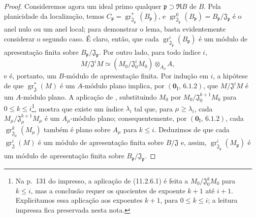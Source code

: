 \begin{proof}
Consideremos agora um ideal primo qualquer $\mathfrak p\supset\mathfrak RB$ de $B$. Pela planicidade da localização, temos $C_{\mathfrak p}=\operatorname{gr}_{\mathfrak J_{\mathfrak p}}^*(B_{\mathfrak p})$, e $\operatorname{gr}_{\mathfrak J_{\mathfrak p}}^0(B_{\mathfrak p})=B_{\mathfrak p}/\mathfrak J_{\mathfrak p}$ é o anel nulo ou um anel local; para demonstrar o lema, basta evidentemente considerar o segundo caso. É claro, então, que cada $\operatorname{gr}_{\mathfrak J_{\mathfrak p}}^i(B_{\mathfrak p})$ é um módulo de apresentação finita sobre $B_{\mathfrak p}/\mathfrak J_{\mathfrak p}$. Por outro lado, para todo índice $i$,
\[
M/\mathfrak J^iM
\simeq(M_0/\mathfrak J_0^iM_0)\otimes_{A_0}A,
\]
e é, portanto, um $B$-módulo de apresentação finita. Por indução em $i$, a hipótese de que $\operatorname{gr}_{\mathfrak J}^*(M)$ é um $A$-módulo plano implica, por $(\mathbf 0_{\mathrm I},\,6.1.2)$, que $M/\mathfrak J^iM$ é um $A$-módulo plano. A aplicação de , substituindo $M_0$ por $M_0/\mathfrak J_0^{k+1}M_0$ para $0\leq k\leq i$\footnote{Na p.~131 do impresso, a aplicação de (11.2.6.1) é feita a $M_0/\mathfrak J_0^kM_0$ para $k\leq i$, mas a conclusão requer os quocientes de expoente $k+1$ até $i+1$. Explicitamos essa aplicação aos expoentes $k+1$, para $0\leq k\leq i$; a leitura impressa fica preservada nesta nota.}, mostra que existe um índice $\lambda_i$ tal que, para $\mu\geq\lambda_i$, cada $M_\mu/\mathfrak J_\mu^{k+1}M_\mu$ é um $A_\mu$-módulo plano; consequentemente, por $(\mathbf 0_{\mathrm I},\,6.1.2)$, cada $\operatorname{gr}_{\mathfrak J_\mu}^k(M_\mu)$ também é plano sobre $A_\mu$ para $k\leq i$. Deduzimos de  que cada $\operatorname{gr}_{\mathfrak J}^i(M)$ é um módulo de apresentação finita sobre $B/\mathfrak J$ e, assim, $\operatorname{gr}_{\mathfrak J_{\mathfrak p}}^i(M_{\mathfrak p})$ é um módulo de apresentação finita sobre $B_{\mathfrak p}/\mathfrak J_{\mathfrak p}$.


\end{proof}

